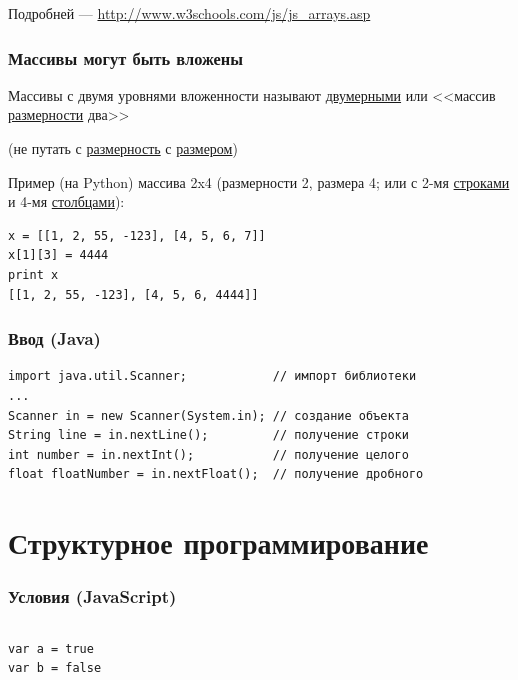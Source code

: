 {\begin{frame}[fragile]
  \vspace{0.5cm}
  Подробней --- \url{http://www.w3schools.com/js/js\_arrays.asp}
\end{frame}

\begin{frame}[fragile]
  \frametitle{Массивы могут быть вложены}
  Массивы с двумя уровнями вложенности называют \underline{двумерными} или
  <<массив \underline{размерности} два>>

  (не путать с \underline{размерность} с \underline{размером})

  \vspace{0.5cm}
  Пример (на Python) массива 2x4 (размерности 2, размера 4; или с 2-мя \underline{строками} и 4-мя \underline{столбцами}):
  \begin{verbatim}
x = [[1, 2, 55, -123], [4, 5, 6, 7]]
x[1][3] = 4444
print x
[[1, 2, 55, -123], [4, 5, 6, 4444]]
  \end{verbatim}
\end{frame}

\begin{frame}[fragile]
  \frametitle{Ввод (Java)}
  \begin{verbatim}
import java.util.Scanner;            // импорт библиотеки
...
Scanner in = new Scanner(System.in); // создание объекта
String line = in.nextLine();         // получение строки
int number = in.nextInt();           // получение целого
float floatNumber = in.nextFloat();  // получение дробного
  \end{verbatim}
\end{frame}



\section{Структурное программирование}
\begin{frame}[fragile]
\frametitle{Условия (JavaScript)}
\begin{columns}
    \begin{verbatim}
var a = true
var b = false


\end{verbatim}
\end{columns}
\end{frame}}
